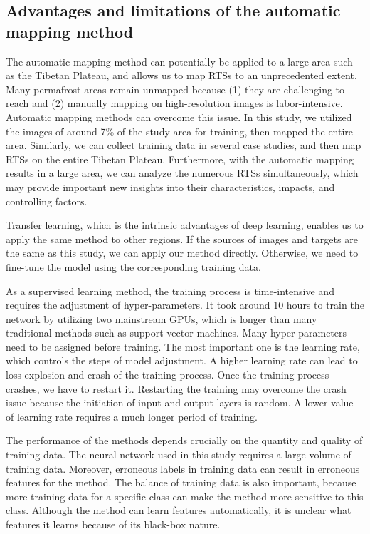 \documentclass[authoryear,preprint,review,12pt]{elsarticle}
\begin{document}
\subsection{Advantages and limitations of the automatic mapping method}
\label{subsec_advantage_limitation_method}

The automatic mapping method can potentially be applied to a large area such as the Tibetan Plateau, and allows us to map RTSs to an unprecedented extent. Many permafrost areas remain unmapped because (1) they are challenging to reach and (2) manually mapping on high-resolution images is labor-intensive. Automatic mapping methods can overcome this issue. In this study, we utilized the images of around 7\% of the study area for training, then mapped the entire area. Similarly, we can collect training data in several case studies, and then map RTSs on the entire Tibetan Plateau. Furthermore, with the automatic mapping results in a large area, we can analyze the numerous RTSs simultaneously, which may provide important new insights into their characteristics, impacts, and controlling factors.  

Transfer learning, which is the intrinsic advantages of deep learning, enables us to apply the same method to other regions. If the sources of images and targets are the same as this study, we can apply our method directly. Otherwise, we need to fine-tune the model using the corresponding training data. 

As a supervised learning method, the training process is time-intensive and requires the adjustment of hyper-parameters. It took around 10 hours to train the network by utilizing two mainstream GPUs, which is longer than many traditional methods such as support vector machines. Many hyper-parameters need to be assigned before training. The most important one is the learning rate, which controls the steps of model adjustment. A higher learning rate can lead to loss explosion and crash of the training process. Once the training process crashes, we have to restart it. Restarting the training may overcome the crash issue because the initiation of input and output layers is random. A lower value of learning rate requires a much longer period of training. 

The performance of the methods depends crucially on the quantity and quality of training data. The neural network used in this study requires a large volume of training data. Moreover, erroneous labels in training data can result in erroneous features for the method. The balance of training data is also important, because more training data for a specific class can make the method more sensitive to this class. Although the method can learn features automatically, it is unclear what features it learns because of its black-box nature. 
\end{document}
